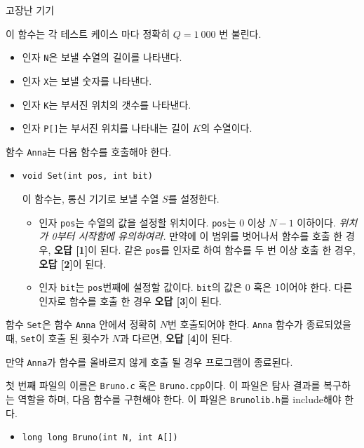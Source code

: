 \begin{problem}{고장난 기기}
\begin{itemize}
		이 함수는 각 테스트 케이스 마다 정확히 $Q = 1\ 000$ 번 불린다.
		\begin{itemize}
			\item 인자 \texttt{N}은 보낼 수열의 길이를 나타낸다.
			\item 인자 \texttt{X}는 보낼 숫자를 나타낸다.
			\item 인자 \texttt{K}는 부서진 위치의 갯수를 나타낸다.
			\item 인자 \texttt{P[]}는 부서진 위치를 나타내는 길이 $K$의 수열이다.
		\end{itemize}
		
		함수 \texttt{Anna}는 다음 함수를 호출해야 한다.
		\begin{itemize}
			\item \texttt{void Set(int pos, int bit)}
			
			이 함수는, 통신 기기로 보낼 수열 $S$를 설정한다.
			
			\begin{itemize}
				\item 인자 \texttt{pos}는 수열의 값을 설정할 위치이다. \texttt{pos}는 0 이상 $N-1$ 이하이다. \textit{위치가 0부터 시작함에 유의하여라.} 만약에 이 범위를 벗어나서 함수를 호출 한 경우, \textbf{오답 [1]}이 된다. 같은 \texttt{pos}를 인자로 하여 함수를 두 번 이상 호출 한 경우, \textbf{오답 [2]}이 된다.
				
				\item 인자 \texttt{bit}는 \texttt{pos}번째에 설정할 값이다. \texttt{bit}의 값은 0 혹은 1이어야 한다. 다른 인자로 함수를 호출 한 경우 \textbf{오답 [3]}이 된다.
			\end{itemize}
			

		\end{itemize}
	
		함수 \texttt{Set}은 함수 \texttt{Anna} 안에서 정확히 $N$번 호출되어야 한다. \texttt{Anna} 함수가 종료되었을 때, \texttt{Set}이 호출 된 횟수가 $N$과 다르면, \textbf{오답 [4]}이 된다.
		
		만약 \texttt{Anna}가 함수를 올바르지 않게 호출 될 경우 프로그램이 종료된다.
		
	\end{itemize}

	첫 번째 파일의 이름은 \texttt{Bruno.c} 혹은 \texttt{Bruno.cpp}이다. 이 파일은 탐사 결과를 복구하는 역할을 하며, 다음 함수를 구현해야 한다. 이 파일은 \texttt{Brunolib.h}를 include해야 한다.
	
	
	\begin{itemize}
		\item \texttt{long long Bruno(int N, int A[])}
		

\end{itemize}
\end{problem}
